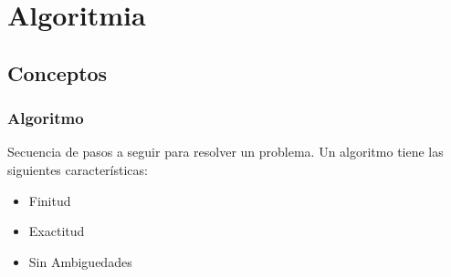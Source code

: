 \section*{Algoritmia}
\subsection*{Conceptos}
\subsubsection*{Algoritmo}
Secuencia de pasos a seguir para resolver un problema. Un algoritmo tiene las siguientes características:
\begin{itemize}
\item Finitud
\item Exactitud
\item Sin Ambiguedades
\end{itemize}